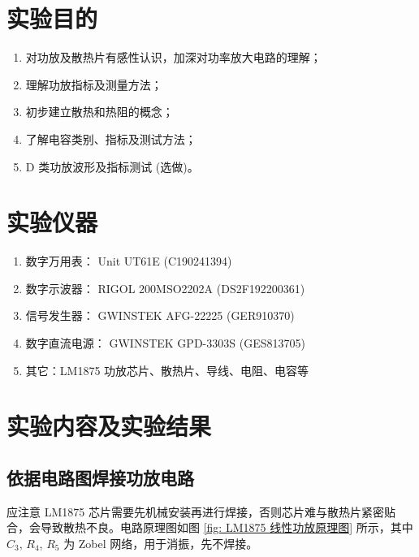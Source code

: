 \documentclass[UTF8]{article}
\begin{document}
\section{实验目的}

\begin{enumerate}
    \item 对功放及散热片有感性认识，加深对功率放大电路的理解；
    \item 理解功放指标及测量方法；
    \item 初步建立散热和热阻的概念；
    \item 了解电容类别、指标及测试方法；
    \item D 类功放波形及指标测试 (选做)。
    \end{enumerate}
    

\section{实验仪器}

\begin{enumerate}
    \item 数字万用表： Unit UT61E (C190241394)
    \item 数字示波器： RIGOL 200MSO2202A (DS2F192200361)
    \item 信号发生器： GWINSTEK AFG-22225 (GER910370)
    \item 数字直流电源： GWINSTEK GPD-3303S (GES813705)
    \item 其它：LM1875 功放芯片、散热片、导线、电阻、电容等
\end{enumerate}


\section{实验内容及实验结果}

\subsection{依据电路图焊接功放电路}

应注意 LM1875 芯片需要先机械安装再进行焊接，否则芯片难与散热片紧密贴合，会导致散热不良。电路原理图如图 \ref{fig: LM1875 线性功放原理图} 所示，其中 $C_3$, $R_4$, $R_5$ 为 Zobel 网络，用于消振，先不焊接。
\end{document}
